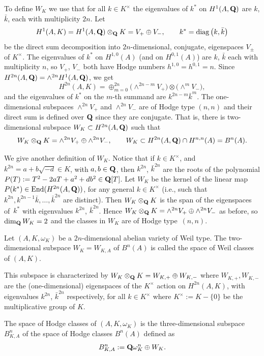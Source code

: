 \documentclass[pdftex]{sigma}
\numberwithin{equation}{section}
\begin{document}
To define $W_K$ we use that for all $k\in K^\times$
the eigenvalues of $k^*$ on $H^1(A,{\bf Q})$ are $k$, $\bar{k}$,
each with multiplicity $2n$. Let
\[
H^1(A,K)=H^1(A,{\bf Q})\otimes_{\bf Q} K=V_+\oplus V_-,\qquad k^* = \operatorname{diag}\big(k,\bar{k}\big)
\]
be the direct sum decomposition into $2n$-dimensional, conjugate, eigenspaces
$V_\pm$ of $K^\times$.
The eigenvalues of $k^*$ on $H^{1,0}(A)$ (and on $H^{0,1}(A)$) are $k$, $\bar{k}$ each with
multiplicity $n$,
so $V_+$, $V_-$ both have Hodge numbers $h^{1,0}=h^{0,1}=n$.
Since $H^{2n}(A,{\bf Q})=\wedge^{2n}H^1(A,{\bf Q})$, we get
\[
H^{2n}(A,K) = \oplus_{m=0}^{2n} \big({\wedge}^{2n-m}V_+\big)\otimes\big({\wedge}^mV_-\big),
\]
and the eigenvalues of $k^*$ on the $m$-th summand are $k^{2n-m}\bar{k}^m$.
The one-dimensional subspaces $\wedge^{2n}V_+$ and $\wedge^{2n}V_-$
are of Hodge type $(n,n)$
and their direct sum is defined over ${\bf Q}$ since they are conjugate.
That is, there is two-dimensional subspace $W_K\subset H^{2n}(A,{\bf Q})$ such that
\[
W_K\otimes_{\bf Q} K = \wedge^{2n}V_+ \oplus \wedge^{2n}V_-,\qquad
W_K\subset H^{2n}(A,{\bf Q})\cap H^{n,n}(A) = B^n(A).
\]

We give another definition of $W_K$.
Notice that if $k\in K^\times$, and $k^{2n}=a+b\sqrt{-d}\in K$,
with $a,b\in{\bf Q}$, then $k^{2n}$, $\bar{k}^{2n}$ are the roots of the polynomial
$P(T):=T^2-2aT+a^2+db^2\in{\bf Q}[T]$.
Let $W_K$ be the kernel of the linear map $P(k^*)\in \operatorname{End}(H^{2n}(A,{\bf Q}))$,
for any general $k\in K^\times$ (i.e., such that
$k^{2n},k^{2n-1}\bar{k},\dots,\bar{k}^{2n}$ are distinct).
Then $W_K\otimes_{\bf Q} K$ is the span of the eigenspaces of~$k^*$
with eigenvalues $k^{2n}$, $\bar{k}^{2n}$.
Hence $W_K\otimes_{\bf Q} K=\wedge^{2n}V_+\oplus\wedge^{2n}V_-$ as before, so
$\dim_{\bf Q} W_K=2$ and the classes in $W_K$ are of Hodge type~$(n,n)$.



\begin{Definition} \label{KB1B2}
Let $(A,K,\omega_K)$ be a $2n$-dimensional abelian variety of Weil type.
The two-dimensional subspace $W_K=W_{K,A}$ of $B^n(A)$ is called the space of Weil classes
of $(A,K)$.

This subspace is characterized by $W_K\otimes_{\bf Q} K=W_{K,+}\oplus W_{K,-}$ where
$W_{K,+}, W_{K,-}$ are the (one-dimensional) eigenspaces of the $K^\times$ action
on $H^{2n}(A,K)$, with eigenvalues $k^{2n}$, $\bar{k}^{2n}$ respectively, for all $k\in K^\times$
where $K^\times:=K-\{0\}$ be the multiplicative group of $K$.


The space of Hodge classes of $(A,K,\omega_K)$ is
the three-dimensional subspace $B^n_{K,A}$ of the space of Hodge classes $B^n(A)$
defined as
\[
B^n_{K,A} := {\bf Q}\omega_K^n \oplus W_K.
\]
\end{Definition}
\end{document}
